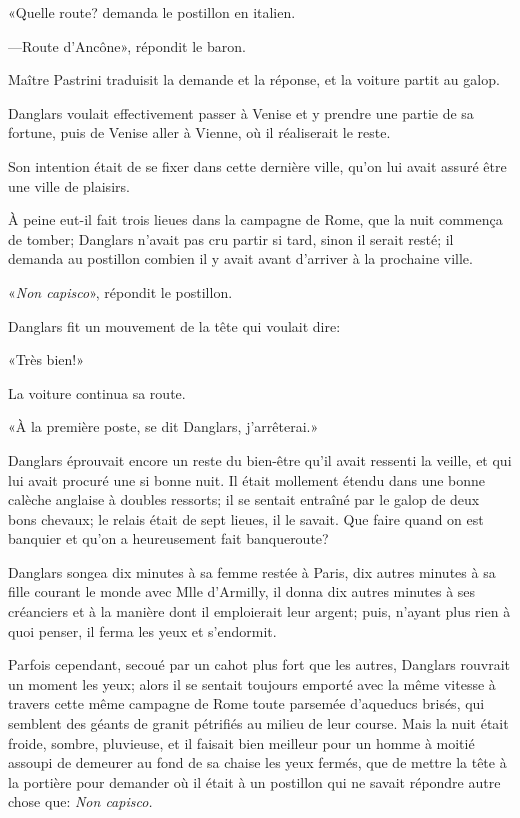 «Quelle route? demanda le postillon en italien. 

—Route d'Ancône», répondit le baron. 

Maître Pastrini traduisit la demande et la réponse, et la voiture partit au galop. 

Danglars voulait effectivement passer à Venise et y prendre une partie de sa fortune, puis de Venise aller à Vienne, où il réaliserait le reste. 

Son intention était de se fixer dans cette dernière ville, qu'on lui avait assuré être une ville de plaisirs. 

À peine eut-il fait trois lieues dans la campagne de Rome, que la nuit commença de tomber; Danglars n'avait pas cru partir si tard, sinon il serait resté; il demanda au postillon combien il y avait avant d'arriver à la prochaine ville. 

«\textit{Non capisco}», répondit le postillon. 

Danglars fit un mouvement de la tête qui voulait dire: 

«Très bien!» 

La voiture continua sa route. 

«À la première poste, se dit Danglars, j'arrêterai.» 

Danglars éprouvait encore un reste du bien-être qu'il avait ressenti la veille, et qui lui avait procuré une si bonne nuit. Il était mollement étendu dans une bonne calèche anglaise à doubles ressorts; il se sentait entraîné par le galop de deux bons chevaux; le relais était de sept lieues, il le savait. Que faire quand on est banquier et qu'on a heureusement fait banqueroute? 

Danglars songea dix minutes à sa femme restée à Paris, dix autres minutes à sa fille courant le monde avec Mlle d'Armilly, il donna dix autres minutes à ses créanciers et à la manière dont il emploierait leur argent; puis, n'ayant plus rien à quoi penser, il ferma les yeux et s'endormit. 

Parfois cependant, secoué par un cahot plus fort que les autres, Danglars rouvrait un moment les yeux; alors il se sentait toujours emporté avec la même vitesse à travers cette même campagne de Rome toute parsemée d'aqueducs brisés, qui semblent des géants de granit pétrifiés au milieu de leur course. Mais la nuit était froide, sombre, pluvieuse, et il faisait bien meilleur pour un homme à moitié assoupi de demeurer au fond de sa chaise les yeux fermés, que de mettre la tête à la portière pour demander où il était à un postillon qui ne savait répondre autre chose que: \textit{Non capisco.} 

